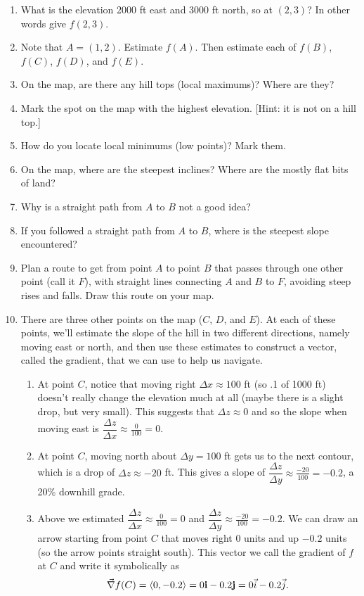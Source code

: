 \documentclass[letterpaper,oneside]{book}%
\newcommand{\ds}{\displaystyle}
\begin{document}
\begin{enumerate}
 \item What is the elevation 2000 ft east and 3000 ft north, so at $(2,3)$? In other words give $f(2,3)$.  
 \item Note that $A=(1,2)$. Estimate $f(A)$. Then estimate each of $f(B)$,   $f(C)$,   $f(D)$, and $f(E)$.
 \item On the map, are there any hill tops (local maximums)?  Where are they? 
 \item Mark the spot on the map with the highest elevation. [Hint: it is not on a hill top.]
 \item How do you locate local minimums (low points)? Mark them.
 \item On the map, where are the steepest inclines? Where are the mostly flat bits of land?
 \item Why is a straight path from $A$ to $B$ not a good idea?
 \item If you followed a straight path from $A$ to $B$, where is the steepest slope encountered? 
 \item Plan a route to get from point $A$ to point $B$ that passes through one other point (call it $F$), with straight lines connecting $A$ and $B$ to $F$, avoiding steep rises and falls. Draw this route on your map. 
 \item There are three other points on the map ($C$, $D$, and $E$).  At each of these points, we'll estimate the slope of the hill in two different directions, namely moving east or north, and then use these estimates to construct a vector, called the gradient, that we can use to help us navigate. 
 \begin{enumerate}
  \item At point $C$, notice that moving right $\Delta x \approx 100$ ft (so .1 of 1000 ft) doesn't really change the elevation much at all (maybe there is a slight drop, but very small). This suggests that $\Delta z\approx 0$ and so the slope when moving east is $\ds\dfrac{\Delta z}{\Delta x}\approx\frac{0}{100}=0$. 
  \item At point $C$, moving north about $\Delta y = 100$ ft gets us to the next contour, which is a drop of $\Delta z \approx -20$ ft.  This gives a slope of $\ds\dfrac{\Delta z}{\Delta y} \approx \frac{-20}{100} = -0.2$, a 20\% downhill grade. 
  \item Above we estimated $\ds\dfrac{\Delta z}{\Delta x}\approx\frac{0}{100}=0$ and $\ds\dfrac{\Delta z}{\Delta y} \approx \frac{-20}{100} = -0.2$. We can draw an arrow starting from point $C$ that moves right 0 units and up $-0.2$ units (so the arrow points straight south). This vector we call the gradient of $f$ at $C$ and write it symbolically as $$\vec \nabla f(C) = \left<0,-0.2\right> = 0{\bf i}-0.2{\bf j} = 0\vec i-0.2\vec j.$$

\end{enumerate}
\end{enumerate}
\end{document}
